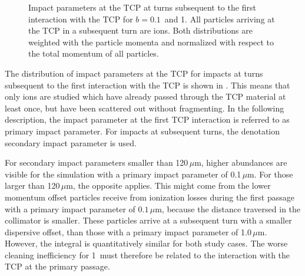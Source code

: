 \begin{figure}[b]
  \centering
  \caption{Impact parameters at the TCP at turns subsequent to the first interaction with the TCP for $b=0.1$\mum\, and 1\mum. All particles arriving at the TCP in a subsequent turn are \lead ions. Both distributions are weighted with the particle momenta and normalized with respect to the total momentum of all particles.}  
  \label{pic:16081005}
  \end{figure}



The distribution of impact parameters at the TCP for impacts at turns subsequent to the first interaction with the TCP is shown in . This means that only ions are studied which have already passed through the TCP material at least once, but have been scattered out without fragmenting. In the following description, the impact parameter at the first TCP interaction is referred to as primary impact parameter. For impacts at subsequent turns, the denotation secondary impact parameter is used. 


For secondary impact parameters smaller than 120$\,\mu$m, higher abundances are visible for the simulation with a primary impact parameter of 0.1$\,\mu$m. For those larger than 120$\,\mu$m, the opposite applies. This might come from the lower momentum offset particles receive from ionization losses during the first passage with a primary impact parameter of $0.1\,\mu$m, because the distance traversed in the collimator is smaller. These particles arrive at a subsequent turn with a smaller dispersive offset, than those with a primary impact parameter of 1.0$\,\mu$m. However, the integral is quantitatively similar for both study cases. The worse cleaning inefficiency for 1\mum\, must therefore be related to the interaction with the TCP at the primary passage. 

